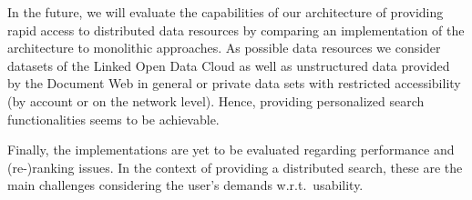 In the future, we will evaluate the capabilities of our architecture of providing rapid access to distributed data resources by comparing an implementation of the architecture to monolithic approaches. 
As possible data resources we consider datasets of the Linked Open Data Cloud as well as unstructured data provided by the Document Web in general or private data sets with restricted accessibility (by account or on the network level).
Hence, providing per\-so\-na\-lized search functionalities seems to be achievable.

Finally, the implementations are yet to be evaluated regarding performance and (re-)ranking issues. 
In the context of providing a distributed search, these are the main challenges considering the user's demands w.r.t.\ usability.









%
% 
%
